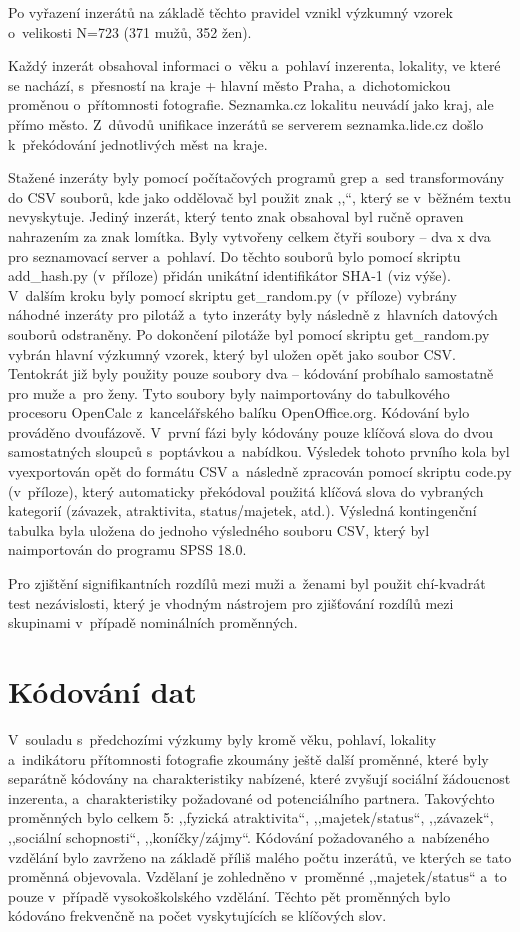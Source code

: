 \documentclass[a4paper, 12pt, notitlepage, oneside, numbers=noenddot]{report}
\begin{document}
Po vyřazení inzerátů na základě těchto pravidel vznikl výzkumný vzorek
o~velikosti N=723 (371 mužů, 352 žen).

Každý inzerát obsahoval informaci o~věku a~pohlaví inzerenta,
lokality, ve které se nachází, s~přesností na kraje + hlavní město
Praha, a~dichotomickou proměnou o~přítomnosti fotografie. Seznamka.cz
lokalitu neuvádí jako kraj, ale přímo město. Z~důvodů unifikace
inzerátů se serverem seznamka.lide.cz došlo k~překódování jednotlivých
měst na kraje.

Stažené inzeráty byly pomocí počítačových programů grep a~sed
transformovány do CSV souborů, kde jako oddělovač byl použit znak
,,{\textbar}``, který se v~běžném textu nevyskytuje. Jediný inzerát,
který tento znak obsahoval byl ručně opraven nahrazením za znak
lomítka. Byly vytvořeny celkem čtyři soubory -- dva x dva pro
seznamovací server a~pohlaví. Do těchto souborů bylo pomocí skriptu
add\_hash.py (v~příloze) přidán unikátní identifikátor SHA-1 (viz
výše). V~dalším kroku byly pomocí skriptu get\_random.py (v~pří\-loze)
vybrány náhodné inzeráty pro pilotáž a~tyto inzeráty byly následně
z~hlavních datových souborů odstraněny. Po dokončení pilotáže byl
pomocí skriptu get\_random.py vybrán hlavní výzkumný vzorek, který byl
uložen opět jako soubor CSV.  Tentokrát již byly použity pouze soubory
dva -- kódování probíhalo samostatně pro muže a~pro ženy.  Tyto
soubory byly naimportovány do tabulkového procesoru OpenCalc
z~kancelářského balíku OpenOffice.org. Kódování bylo prováděno
dvoufázově. V~první fázi byly kódovány pouze klíčová slova do dvou
samostatných sloupců s~poptávkou a~nabídkou. Výsledek tohoto prvního
kola byl vyexportován opět do formátu CSV a~následně zpracován pomocí
skriptu code.py (v~příloze), který automaticky překódoval použitá
klíčová slova do vybraných kategorií (závazek, atraktivita,
status/majetek, atd.).  Výsledná kontingenční tabulka byla uložena do
jednoho výsledného souboru CSV, který byl naimportován do programu
SPSS 18.0.

Pro zjištění signifikantních rozdílů mezi muži a~ženami byl použit
chí-kvadrát test nezávislosti, který je vhodným nástrojem pro
zjišťování rozdílů mezi skupinami v~případě nominálních proměnných.

\section{Kódování dat}
V~souladu s~předchozími výzkumy
\citep{HarrisonSaeed1977,GreenlessMcGrew1994,BarrettDunbarLycett2007}
byly kromě věku, pohlaví, lokality a~indikátoru přítomnosti fotografie
zkoumány ještě další proměnné, které byly separátně kódovány na
charakteristiky nabízené, které zvyšují sociální žádoucnost inzerenta,
a~charakteristiky požadované od potenciálního partnera. Takovýchto
proměnných bylo celkem 5: ,,fyzická atraktivita``, ,,majetek/status``,
,,závazek``, ,,sociální schopnosti``, ,,koníčky/zájmy``. Kódování
požadovaného a~nabízeného vzdělání bylo zavrženo na základě příliš
malého počtu inzerátů, ve kterých se tato proměnná
objevovala. Vzdělaní je zohledněno v~proměnné ,,majetek/sta\-tus`` a~to
pouze v~případě vysokoškolského vzdělání. Těchto pět proměnných bylo
kódováno frekvenčně na počet vyskytujících se klíčových slov.
\end{document}
